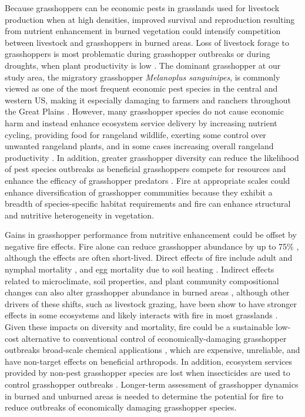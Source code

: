 \documentclass[referee, 
	            sn-basic]
           {sn-jnl}
\begin{document}
\begin{linenumbers}
Because grasshoppers can be economic pests in grasslands used for livestock production when at high densities, improved survival and reproduction resulting from nutrient enhancement in burned vegetation \citep{branson2003} could intensify competition between livestock and grasshoppers in burned areas. Loss of livestock forage to grasshoppers is most problematic during grasshopper outbreaks or during droughts, when plant productivity is low \citep{belovsky1995, joern2000, branson2014}. 
The dominant grasshopper at our study area, the migratory grasshopper \emph{Melanoplus sanguinipes}, is commonly viewed as one of the most frequent economic pest species in the central and western US, making it especially damaging to farmers and ranchers throughout the Great Plains \citep{onsager2000a, olfert2021}. 
However, many grasshopper species do not cause economic harm and instead enhance ecosystem service delivery by increasing nutrient cycling, providing food for rangeland wildlife, exerting some control over unwanted rangeland plants, and in some cases increasing overall rangeland productivity \citep{branson2006}. In addition, greater grasshopper diversity can reduce the likelihood of pest species outbreaks as beneficial grasshoppers compete for resources and enhance the efficacy of grasshopper predators \citep{branson2006}. Fire at appropriate scales could enhance diversification of grasshopper communities because they exhibit a breadth of species-specific habitat requirements and fire can enhance structural and nutritive heterogeneity in vegetation. 

Gains in grasshopper performance from nutritive enhancement could be offset by negative fire effects. Fire alone can reduce grasshopper abundance by up to 75\% \citep{branson2016}, although the effects are often short-lived. Direct effects of fire include adult and nymphal mortality \citep{bock1991}, and egg mortality due to soil heating \citep{branson2007, branson2013, branson2016, vermeire2004}. Indirect effects related to microclimate, soil properties, and plant community compositional changes can also alter grasshopper abundance in burned areas \citep{vanwingerden1991,schirmel2011, evans1983,matenaar2014, meyer2002}, although other drivers of these shifts, such as livestock grazing, have been show to have stronger effects in some ecosystems \citep{joern2005} and likely interacts with fire in most grasslands \citep{mcgranahan2021,fuhlendorf2009}. Given these impacts on diversity and mortality, fire could be a sustainable low-cost alternative to conventional control of economically-damaging grasshopper outbreaks \textemdash broad-scale chemical applications \citep{branson2006}, which are expensive, unreliable, and have non-target effects on beneficial arthropods. In addition, ecosystem services provided by non-pest grasshopper species are lost when insecticides are used to control grasshopper outbreaks \citep{joern2000}. Longer-term assessment of grasshopper dynamics in burned and unburned areas is needed to determine the potential for fire to reduce outbreaks of economically damaging grasshopper species.  


\end{linenumbers}
\end{document}
